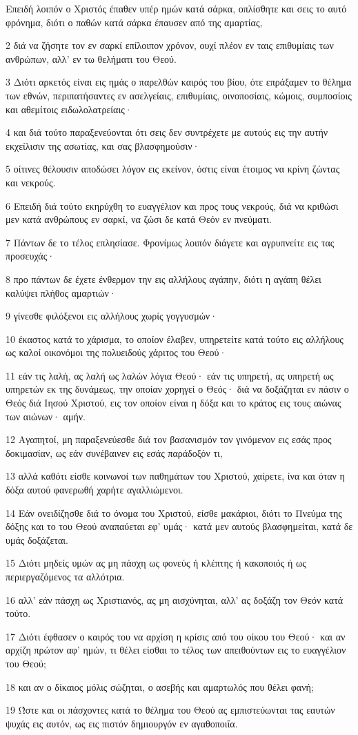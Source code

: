 \par Επειδή λοιπόν ο Χριστός έπαθεν υπέρ ημών κατά σάρκα, οπλίσθητε και σεις το αυτό φρόνημα, διότι ο παθών κατά σάρκα έπαυσεν από της αμαρτίας,
\par 2 διά να ζήσητε τον εν σαρκί επίλοιπον χρόνον, ουχί πλέον εν ταις επιθυμίαις των ανθρώπων, αλλ' εν τω θελήματι του Θεού.
\par 3 Διότι αρκετός είναι εις ημάς ο παρελθών καιρός του βίου, ότε επράξαμεν το θέλημα των εθνών, περιπατήσαντες εν ασελγείαις, επιθυμίαις, οινοποσίαις, κώμοις, συμποσίοις και αθεμίτοις ειδωλολατρείαις·
\par 4 και διά τούτο παραξενεύονται ότι σεις δεν συντρέχετε με αυτούς εις την αυτήν εκχείλισιν της ασωτίας, και σας βλασφημούσιν·
\par 5 οίτινες θέλουσιν αποδώσει λόγον εις εκείνον, όστις είναι έτοιμος να κρίνη ζώντας και νεκρούς.
\par 6 Επειδή διά τούτο εκηρύχθη το ευαγγέλιον και προς τους νεκρούς, διά να κριθώσι μεν κατά ανθρώπους εν σαρκί, να ζώσι δε κατά Θεόν εν πνεύματι.
\par 7 Πάντων δε το τέλος επλησίασε. Φρονίμως λοιπόν διάγετε και αγρυπνείτε εις τας προσευχάς·
\par 8 προ πάντων δε έχετε ένθερμον την εις αλλήλους αγάπην, διότι η αγάπη θέλει καλύψει πλήθος αμαρτιών·
\par 9 γίνεσθε φιλόξενοι εις αλλήλους χωρίς γογγυσμών·
\par 10 έκαστος κατά το χάρισμα, το οποίον έλαβεν, υπηρετείτε κατά τούτο εις αλλήλους ως καλοί οικονόμοι της πολυειδούς χάριτος του Θεού·
\par 11 εάν τις λαλή, ας λαλή ως λαλών λόγια Θεού· εάν τις υπηρετή, ας υπηρετή ως υπηρετών εκ της δυνάμεως, την οποίαν χορηγεί ο Θεός· διά να δοξάζηται εν πάσιν ο Θεός διά Ιησού Χριστού, εις τον οποίον είναι η δόξα και το κράτος εις τους αιώνας των αιώνων· αμήν.
\par 12 Αγαπητοί, μη παραξενεύεσθε διά τον βασανισμόν τον γινόμενον εις εσάς προς δοκιμασίαν, ως εάν συνέβαινεν εις εσάς παράδοξόν τι,
\par 13 αλλά καθότι είσθε κοινωνοί των παθημάτων του Χριστού, χαίρετε, ίνα και όταν η δόξα αυτού φανερωθή χαρήτε αγαλλιώμενοι.
\par 14 Εάν ονειδίζησθε διά το όνομα του Χριστού, είσθε μακάριοι, διότι το Πνεύμα της δόξης και το του Θεού αναπαύεται εφ' υμάς· κατά μεν αυτούς βλασφημείται, κατά δε υμάς δοξάζεται.
\par 15 Διότι μηδείς υμών ας μη πάσχη ως φονεύς ή κλέπτης ή κακοποιός ή ως περιεργαζόμενος τα αλλότρια.
\par 16 αλλ' εάν πάσχη ως Χριστιανός, ας μη αισχύνηται, αλλ' ας δοξάζη τον Θεόν κατά τούτο.
\par 17 Διότι έφθασεν ο καιρός του να αρχίση η κρίσις από του οίκου του Θεού· και αν αρχίζη πρώτον αφ' ημών, τι θέλει είσθαι το τέλος των απειθούντων εις το ευαγγέλιον του Θεού;
\par 18 και αν ο δίκαιος μόλις σώζηται, ο ασεβής και αμαρτωλός που θέλει φανή;
\par 19 Ώστε και οι πάσχοντες κατά το θέλημα του Θεού ας εμπιστεύωνται τας εαυτών ψυχάς εις αυτόν, ως εις πιστόν δημιουργόν εν αγαθοποιΐα.

